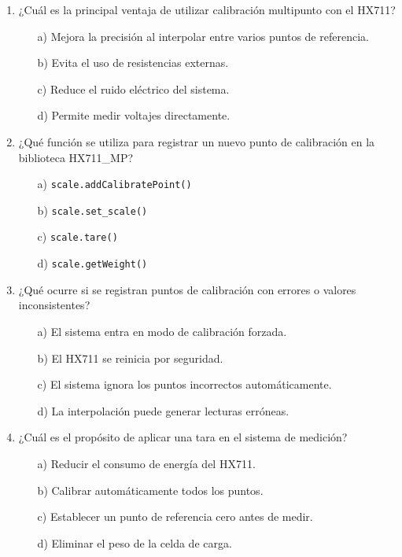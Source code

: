 \begin{enumerate}
  \item ¿Cuál es la principal ventaja de utilizar calibración multipunto con el HX711?
  \begin{itemize}
    \item[a)] Mejora la precisión al interpolar entre varios puntos de referencia.
    \item[b)] Evita el uso de resistencias externas.
    \item[c)] Reduce el ruido eléctrico del sistema.
    \item[d)] Permite medir voltajes directamente.
  \end{itemize}

  \item ¿Qué función se utiliza para registrar un nuevo punto de calibración en la biblioteca HX711\_MP?
  \begin{itemize}
    \item[a)] \texttt{scale.addCalibratePoint()}
    \item[b)] \texttt{scale.set\_scale()}
    \item[c)] \texttt{scale.tare()}
    \item[d)] \texttt{scale.getWeight()}
  \end{itemize}

  \item ¿Qué ocurre si se registran puntos de calibración con errores o valores inconsistentes?
  \begin{itemize}
    \item[a)] El sistema entra en modo de calibración forzada.
    \item[b)] El HX711 se reinicia por seguridad.
    \item[c)] El sistema ignora los puntos incorrectos automáticamente.
    \item[d)] La interpolación puede generar lecturas erróneas.
  \end{itemize}

  \item ¿Cuál es el propósito de aplicar una tara en el sistema de medición?
  \begin{itemize}
    \item[a)] Reducir el consumo de energía del HX711.
    \item[b)] Calibrar automáticamente todos los puntos.
    \item[c)] Establecer un punto de referencia cero antes de medir.
    \item[d)] Eliminar el peso de la celda de carga.
  \end{itemize}


\end{enumerate}

